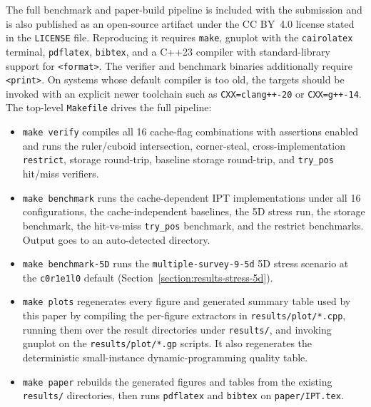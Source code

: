 \documentclass[manuscript,screen,review]{acmart}
\theoremstyle{definition}
\theoremstyle{plain}
\begin{document}
The full benchmark and paper-build pipeline is included with the
submission and is also published as an open-source artifact under the
CC BY~4.0 license stated in the \texttt{LICENSE} file. Reproducing it requires
\texttt{make}, gnuplot with the \texttt{cairolatex} terminal,
\texttt{pdflatex}, \texttt{bibtex}, and a C++23 compiler with
standard-library support for \texttt{<format>}. The verifier and
benchmark binaries additionally require \texttt{<print>}. On systems
whose default compiler is too old, the targets should be invoked with
an explicit newer toolchain such as \texttt{CXX=clang++-20} or
\texttt{CXX=g++-14}. The top-level \texttt{Makefile} drives the full
pipeline:
\begin{itemize}
  \item \texttt{make verify} compiles all 16 cache-flag combinations
    with assertions enabled and runs the ruler/cuboid intersection,
    corner-steal, cross-implementation \texttt{restrict}, storage
    round-trip, baseline storage round-trip, and \texttt{try\_pos}
    hit/miss verifiers.
  \item \texttt{make benchmark} runs the cache-dependent IPT
    implementations under all 16 configurations, the
    cache-independent baselines, the 5D stress run, the storage
    benchmark, the hit-vs-miss \texttt{try\_pos} benchmark, and the
    restrict benchmarks. Output goes to an auto-detected
    directory.
  \item \texttt{make benchmark-5D} runs the
    \texttt{multiple-survey-9-5d} 5D stress scenario at the
    \texttt{c0r1e1l0} default
    (Section~\ref{section:results-stress-5d}).
  \item \texttt{make plots} regenerates every figure and generated
    summary table used by this paper by compiling the per-figure
    extractors in
    \texttt{results/plot/*.cpp}, running them over the result
    directories under \texttt{results/}, and invoking gnuplot on the
    \texttt{results/plot/*.gp} scripts. It also regenerates the
    deterministic small-instance dynamic-programming quality table.
  \item \texttt{make paper} rebuilds the generated figures and tables
    from the existing \texttt{results/} directories, then runs
    \texttt{pdflatex} and \texttt{bibtex} on \texttt{paper/IPT.tex}.
\end{itemize}
\end{document}
